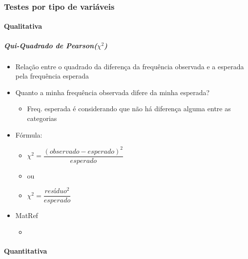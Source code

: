 \documentclass[
  letterpaper,
  DIV=11,
  numbers=noendperiod]{scrreprt}
\let\oldparagraph\paragraph
\renewcommand{\paragraph}[1]{\oldparagraph{#1}\mbox{}}
\let\oldsubparagraph\subparagraph
\renewcommand{\subparagraph}[1]{\oldsubparagraph{#1}\mbox{}}
\providecommand{\tightlist}{%
  \setlength{\itemsep}{0pt}\setlength{\parskip}{0pt}}\usepackage{longtable,booktabs,array}
\begin{document}
\hypertarget{testes-por-tipo-de-variuxe1veis}{%
\subsubsection{Testes por tipo de
variáveis}\label{testes-por-tipo-de-variuxe1veis}}

\hypertarget{qualitativa}{%
\paragraph{Qualitativa}\label{qualitativa}}

\hypertarget{qui-quadrado-de-pearsonchi2}{%
\subparagraph{\texorpdfstring{Qui-Quadrado de
Pearson(\(\chi^2\))}{Qui-Quadrado de Pearson(\textbackslash chi\^{}2)}}\label{qui-quadrado-de-pearsonchi2}}

\begin{itemize}
\item
  Relação entre o quadrado da diferença da frequência observada e a
  esperada pela frequência esperada
\item
  Quanto a minha frequência observada difere da minha esperada?

  \begin{itemize}
  \tightlist
  \item
    Freq. esperada é considerando que não há diferença alguma entre as
    categorias
  \end{itemize}
\item
  Fórmula:

  \begin{itemize}
  \tightlist
  \item
    \(\chi^2=\dfrac{(observado - esperado)^2}{esperado}\)
  \item
    ou
  \item
    \(\chi^2=\dfrac{resíduo^2}{esperado}\)
  \end{itemize}
\item
  MatRef

  \begin{itemize}
  \tightlist
  \item
    \href{http://w3.ufsm.br/adriano/aulas/qq/pqq.pdf}{}
  \end{itemize}
\end{itemize}

\hypertarget{quantitativa}{%
\paragraph{Quantitativa}\label{quantitativa}}
\end{document}
